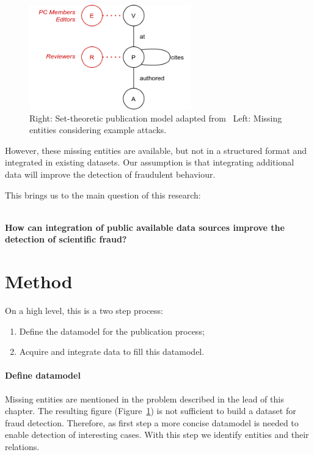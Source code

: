 \documentclass{ou-report}
\begin{document}
\begin{figure}[H]
\centering
\includegraphics[width=7cm]{images/jm2017_miss_ent.png}
\caption{Right: Set-theoretic publication model adapted from~\cite{JM2017} Left: Missing entities considering example attacks.}
\label{fig:jm2017_missing_ent}
\end{figure}

However, these missing entities are available, but not in a structured format and
integrated in existing datasets. 
Our assumption is that integrating additional data will improve the detection
of fraudulent behaviour. 

This brings us to the main question of this research:

\ \\

\textbf{How can integration of public available data sources improve the 
detection of scientific fraud?} \\


\section{Method}
On a high level, this is a two step process:
\begin{enumerate}
    \item Define the datamodel for the publication process;
    \item Acquire and integrate data to fill this datamodel.
\end{enumerate}

\paragraph{Define datamodel}
Missing entities are mentioned in the problem described in the lead of this 
chapter. The resulting figure
(Figure~\ref{fig:jm2017_missing_ent}) is not sufficient to build a dataset 
for fraud detection. Therefore, as first step a more concise datamodel is needed
to enable detection of interesting cases. With this step we identify entities
and their relations.
\end{document}
